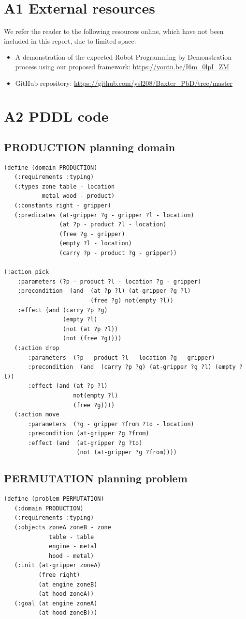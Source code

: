 \chapter{A1 External resources}\label{External resources}
We refer the reader to the following resources online, which have not been included in this report, due to limited space:
\begin{itemize}
\item A demonstration of the expected Robot Programming by Demonstration process using our proposed framework: \url{https://youtu.be/I6m_0lpI_ZM}
\item GitHub repository: \url{https://github.com/ysl208/Baxter_PbD/tree/master}
\end{itemize}
\chapter{A2 PDDL code}\label{PRODUCTION domain}
\section{PRODUCTION planning domain}
\begin{verbatim}
(define (domain PRODUCTION)
   (:requirements :typing)
   (:types zone table - location
           metal wood - product)
   (:constants right - gripper)
   (:predicates (at-gripper ?g - gripper ?l - location)
                (at ?p - product ?l - location)
                (free ?g - gripper)
                (empty ?l - location)
                (carry ?p - product ?g - gripper))

(:action pick
    :parameters (?p - product ?l - location ?g - gripper)
    :precondition  (and  (at ?p ?l) (at-gripper ?g ?l) 
                         (free ?g) not(empty ?l))
    :effect (and (carry ?p ?g)
                 (empty ?l)
                 (not (at ?p ?l)) 
                 (not (free ?g))))
   (:action drop
       :parameters  (?p - product ?l - location ?g - gripper)
       :precondition  (and  (carry ?p ?g) (at-gripper ?g ?l) (empty ?l))
       :effect (and (at ?p ?l)
                    not(empty ?l)
                    (free ?g))))
   (:action move
       :parameters  (?g - gripper ?from ?to - location)
       :precondition (at-gripper ?g ?from)
       :effect (and  (at-gripper ?g ?to)
                     (not (at-gripper ?g ?from))))
\end{verbatim}
                     
\section{PERMUTATION planning problem}
\begin{verbatim}
(define (problem PERMUTATION)
   (:domain PRODUCTION)
   (:requirements :typing)
   (:objects zoneA zoneB - zone
             table - table
             engine - metal
             hood - metal)
   (:init (at-gripper zoneA)
          (free right)
          (at engine zoneB)
          (at hood zoneA))
   (:goal (at engine zoneA)
          (at hood zoneB)))
\end{verbatim}

